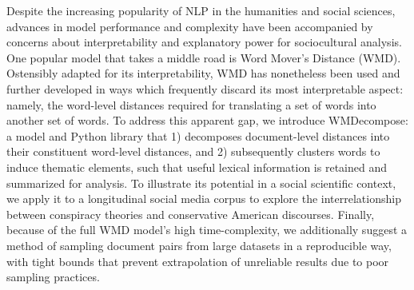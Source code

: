 Despite the increasing popularity of NLP in the humanities and social sciences, advances in model performance and complexity have been accompanied by concerns about interpretability and explanatory power for sociocultural analysis. One popular model that takes a middle road is Word Mover's Distance (WMD). Ostensibly adapted for its interpretability, WMD has nonetheless been used and further developed in ways which frequently discard its most interpretable aspect: namely, the word-level distances required for translating a set of words into another set of words. To address this apparent gap, we introduce WMDecompose: a model and Python library that 1) decomposes document-level distances into their constituent word-level distances, and 2) subsequently clusters words to induce thematic elements, such that useful lexical information is retained and summarized for analysis. To illustrate its potential in a social scientific context, we apply it to a longitudinal social media corpus to explore the interrelationship between conspiracy theories and conservative American discourses. Finally, because of the full WMD model's high time-complexity, we additionally suggest a method of sampling document pairs from large datasets in a reproducible way, with tight bounds that prevent extrapolation of unreliable results due to poor sampling practices.
